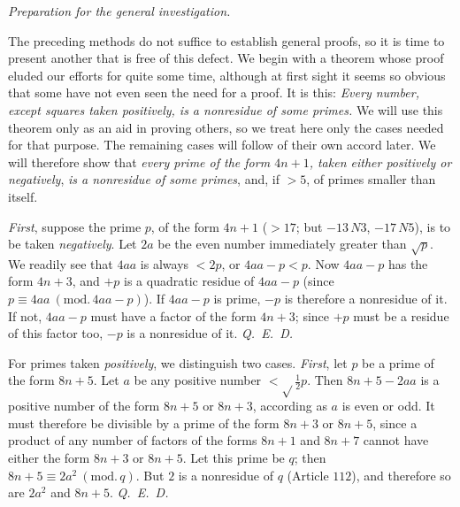 \begin{center}\textit{Preparation for the general investigation.}\end{center}

The preceding methods do not suffice to establish general proofs, so it is time to present another that is free of this defect. We begin with a theorem whose proof eluded our efforts for quite some time, although at first sight it seems so obvious that some have not even seen the need for a proof. It is this: \textit{Every number, except squares taken positively, is a nonresidue of some primes.} We will use this theorem only as an aid in proving others, so we treat here only the cases needed for that purpose. The remaining cases will follow of their own accord later. We will therefore show that \textit{every prime of the form $4n+1$, taken either positively or negatively}, \textit{is a nonresidue of some primes}, and, if $>5$, of primes smaller than itself.

\textit{First}, suppose the prime $p$, of the form $4n+1$ ($>17$; but $-13\,N3$, $-17\,N5$), is to be taken \textit{negatively}. Let $2a$ be the even number immediately greater than $\surd p$. We readily see that $4aa$ is always $<2p$, or $4aa-p<p$. Now $4aa-p$ has the form $4n+3$, and $+p$ is a quadratic residue of $4aa-p$ (since $p\equiv4aa\ (\mathrm{mod.}\,4aa-p)$). If $4aa-p$ is prime, $-p$ is therefore a nonresidue of it. If not, $4aa-p$ must have a factor of the form $4n+3$; since $+p$ must be a residue of this factor too, $-p$ is a nonresidue of it. \mbox{\textit{Q. E. D.}}

For primes taken \textit{positively}, we distinguish two cases. \textit{First}, let $p$ be a prime of the form $8n+5$. Let $a$ be any positive number $<\surd\!\frac12 p$. Then $8n+5-2aa$ is a positive number of the form $8n+5$ or $8n+3$, according as $a$ is even or odd. It must therefore be divisible by a prime of the form $8n+3$ or $8n+5$, since a product of any number of factors of the forms $8n+1$ and $8n+7$ cannot have either the form $8n+3$ or $8n+5$. Let this prime be $q$; then $8n+5\equiv2a^2\ (\mathrm{mod.}\,q)$. But $2$ is a nonresidue of $q$ (Article $112$), and therefore so are $2a^2$ and $8n+5$. \mbox{\textit{Q. E. D.}}


